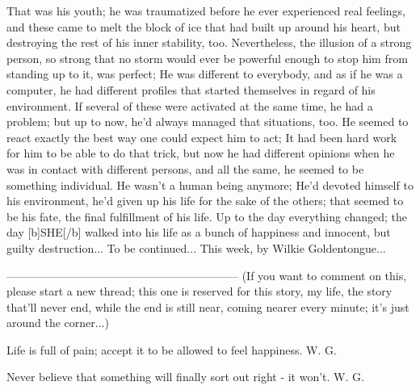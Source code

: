 That was his youth; he was traumatized before he ever experienced real feelings, and these came to melt the block of ice that had built up around his heart, but destroying the rest of his inner stability, too. Nevertheless, the illusion of a strong person, so strong that no storm would ever be powerful enough to stop him from standing up to it, was perfect; He was different to everybody, and as if he was a computer, he had different profiles that started themselves in regard of his environment. If several of these were activated at the same time, he had a problem; but up to now, he'd always managed that situations, too. He seemed to react exactly the best way one could expect him to act; It had been hard work for him to be able to do that trick, but now he had different opinions when he was in contact with different persons, and all the same, he seemed to be something individual. He wasn't a human being anymore; He'd devoted himself to his environment, he'd given up his life for the sake of the others; that seemed to be his fate, the final fulfillment of his life. 
Up to the day everything changed; the day [b]SHE[/b] walked into his life as a bunch of happiness and innocent, but guilty destruction...
To be continued...
This week, by Wilkie Goldentongue...

--------------------------------------------------------------
(If you want to comment on this, please start a new thread; this one is reserved for this story, my life, the story that'll never end, while the end is still near, coming nearer every minute; it's just around the corner...)

Life is full of pain; accept it to be allowed to feel happiness. 
											W. G. 

Never believe that something will finally sort out right - it won't.
											W. G. 
